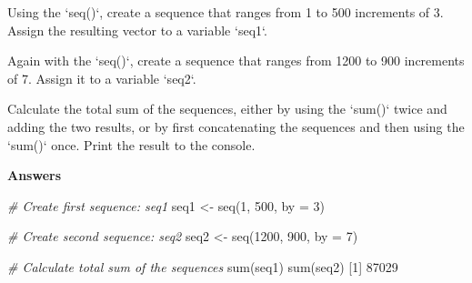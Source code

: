 \documentclass[]{article}
\newcommand{\hlnum}[1]{\textcolor[rgb]{0.816,0.125,0.439}{#1}}%
\newcommand{\hlstr}[1]{\textcolor[rgb]{0.251,0.627,0.251}{#1}}%
\newcommand{\hlcom}[1]{\textcolor[rgb]{0.502,0.502,0.502}{\textit{#1}}}%
\newcommand{\hlstd}[1]{\textcolor[rgb]{0.251,0.251,0.251}{#1}}%
\newcommand{\hlkwc}[1]{\textcolor[rgb]{0.251,0.251,0.251}{#1}}%
\newcommand{\hlkwd}[1]{\textcolor[rgb]{0.878,0.439,0.125}{#1}}%
\newenvironment{Shaded}{\begin{myshaded}}{\end{myshaded}}
\newcommand{\KeywordTok}[1]{\hlkwd{#1}}
\newcommand{\DataTypeTok}[1]{\hlkwc{#1}}
\newcommand{\DecValTok}[1]{\hlnum{#1}}
\newcommand{\StringTok}[1]{\hlstr{#1}}
\newcommand{\CommentTok}[1]{\hlcom{#1}}
\newcommand{\NormalTok}[1]{\hlstd{#1}}
\begin{document}
\begin{Shaded}
\begin{Highlighting}[]

\OperatorTok{*}\StringTok{ }\NormalTok{Using the } \StringTok{`}\DataTypeTok{seq()}\StringTok{`}\NormalTok{, create a sequence that ranges from }\DecValTok{1}\NormalTok{ to }\DecValTok{500} \NormalTok{ increments of }\DecValTok{3}\NormalTok{. Assign the resulting vector to a variable }\StringTok{`}\DataTypeTok{seq1}\StringTok{`}\NormalTok{.}

\OperatorTok{*}\StringTok{ }\NormalTok{Again with the } \StringTok{`}\DataTypeTok{seq()}\StringTok{`}\NormalTok{, create a sequence that ranges from }\DecValTok{1200}\NormalTok{ to }\DecValTok{900} \NormalTok{ increments of }\OperatorTok{-}\DecValTok{7}\NormalTok{. Assign it to a variable }\StringTok{`}\DataTypeTok{seq2}\StringTok{`}\NormalTok{.}

\OperatorTok{*}\StringTok{ }\NormalTok{Calculate the total sum of the sequences, either by using the }\StringTok{`}\DataTypeTok{sum()}\StringTok{`} \NormalTok{ twice and adding the two results, or by first concatenating the sequences and then using the }\StringTok{`}\DataTypeTok{sum()}\StringTok{`} \NormalTok{ once. Print the result to the console.}
\end{Highlighting}
\end{Shaded}

\textbf{Answers}

\begin{Shaded}
\begin{Highlighting}[]
\CommentTok{# Create first sequence: seq1}
\NormalTok{seq1 <-}\StringTok{ }\KeywordTok{seq}\NormalTok{(}\DecValTok{1}\NormalTok{, }\DecValTok{500}\NormalTok{, }\DataTypeTok{by =} \DecValTok{3}\NormalTok{)}

\CommentTok{# Create second sequence: seq2}
\NormalTok{seq2 <-}\StringTok{ }\KeywordTok{seq}\NormalTok{(}\DecValTok{1200}\NormalTok{, }\DecValTok{900}\NormalTok{, }\DataTypeTok{by =} \OperatorTok{-}\DecValTok{7}\NormalTok{)}

\CommentTok{# Calculate total sum of the sequences}
\KeywordTok{sum}\NormalTok{(seq1) }\OperatorTok{+}\StringTok{ }\KeywordTok{sum}\NormalTok{(seq2)}
\NormalTok{   [}\DecValTok{1}\NormalTok{] }\DecValTok{87029}
\end{Highlighting}
\end{Shaded}
\end{document}
